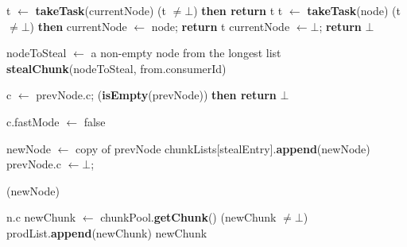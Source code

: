 \begin{algo}[!ht]
\begin{minipage}[t]{0.48\textwidth}
\begin{distribalgo}[1]
		\STATE t $\leftarrow$ {\bf takeTask}(currentNode)
		 (t $\neq \bot$) {\bf then return} t
	\ENDINDENT
  		\STATE t $\leftarrow$ {\bf takeTask}(node)
			 (t $\neq \bot$) {\bf then} currentNode $\leftarrow$ node; {\bf return} t
  	\ENDINDENT
	\ENDINDENT
	\STATE currentNode $\leftarrow \bot$; {\bf return} $\bot$
\ENDINDENT

\medskip

	\STATE nodeToSteal $\leftarrow$ a non-empty node from the longest list
	 {\bf stealChunk}(nodeToSteal, from.consumerId)
%		
%	
\ENDINDENT

\medskip

  \STATE c $\leftarrow$ prevNode.c;
   ({\bf isEmpty}(prevNode)) {\bf then return} $\bot$

  \STATE c.fastMode $\leftarrow$ false
  
	\STATE newNode $\leftarrow$ copy of prevNode
	\STATE chunkLists[stealEntry].{\bf append}(newNode)
	\STATE prevNode.c $\leftarrow \bot$; 
		
	(newNode)
\ENDINDENT

\medskip

			 n.c
		\ENDINDENT
	\ENDINDENT
	\STATE newChunk $\leftarrow$ chunkPool.{\bf getChunk}()
	 (newChunk $\neq \bot$) prodList.{\bf append}(newChunk)
	 newChunk
\ENDINDENT

\setcounter{alg:fifo:lines}{\value{ALC@line}}
\end{distribalgo}
\end{minipage}
\end{algo}

